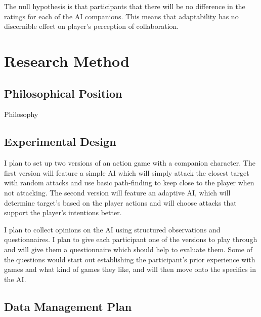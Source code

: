 \documentclass{IEEEtran}
\begin{document}
The null hypothesis is that participants that there will be no difference in the ratings for each of the AI companions. This means that adaptability has no discernible effect on player’s perception of collaboration.

\section{Research Method}
\label{ResearchMethod}

\subsection{Philosophical Position}
\label{PhilosophicalPosition}

Philosophy

\subsection{Experimental Design}
\label{ExperimentalDesign}




I plan to set up two versions of an action game with a companion character. The first version will feature a simple AI which will simply attack the closest target with random attacks and use basic path-finding to keep close to the player when not attacking. The second version will feature an adaptive AI, which will determine target's based on the player actions and will choose attacks that support the player's intentions better.

I plan to collect opinions on the AI using structured observations and questionnaires. I plan to give each participant one of the versions to play through and will give them a questionnaire which should help to evaluate them. Some of the questions would start out establishing the participant's prior experience with games and what kind of games they like, and will then move onto the specifics in the AI.

\subsection{Data Management Plan}
\label{DataManagementPlan}
\end{document}
